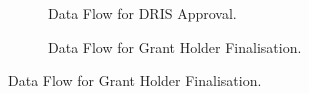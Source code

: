 \documentclass[12pt]{article}
\begin{document}
\begin{figure}
\begin{subfigure}[p]{0.47\textwidth}
\centering	
{}
\caption{Data Flow for DRIS Approval.}
\end{subfigure}

\begin{subfigure}[p]{0.47\textwidth}
\centering	
{}
\caption{Data Flow for Grant Holder Finalisation.}
\end{subfigure}


\end{figure}
\end{document}
